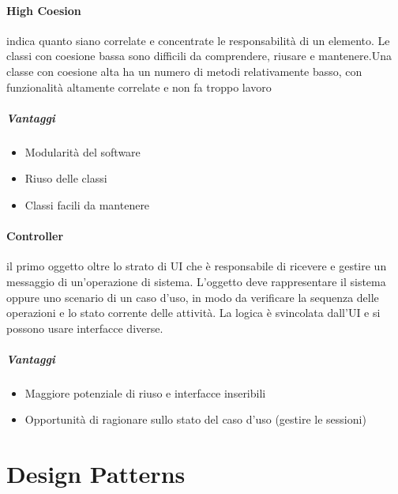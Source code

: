 \documentclass[12pt]{article}
\begin{document}
\paragraph{High Coesion} indica quanto siano correlate e concentrate le responsabilità di un elemento. Le classi con coesione bassa sono difficili da comprendere, riusare e mantenere.Una classe con coesione alta ha un numero di metodi relativamente basso, con funzionalità altamente correlate e non fa troppo lavoro
\subparagraph{Vantaggi}
\begin{itemize}
    \item Modularità del software
    \item Riuso delle classi
    \item Classi facili da mantenere
\end{itemize}
\newpage
\paragraph{Controller} il primo oggetto oltre lo strato di UI che è responsabile di ricevere e gestire un messaggio di un’operazione di sistema. L’oggetto deve rappresentare il sistema oppure uno scenario di un caso d’uso, in modo da verificare la sequenza delle operazioni e lo stato corrente delle attività. La logica è svincolata dall’UI e si possono usare interfacce diverse.
\subparagraph{Vantaggi}
\begin{itemize}
    \item Maggiore potenziale di riuso e interfacce inseribili
    \item Opportunità di ragionare sullo stato del caso d'uso (gestire le sessioni)
\end{itemize}
\newpage
\section{Design Patterns}
\end{document}
